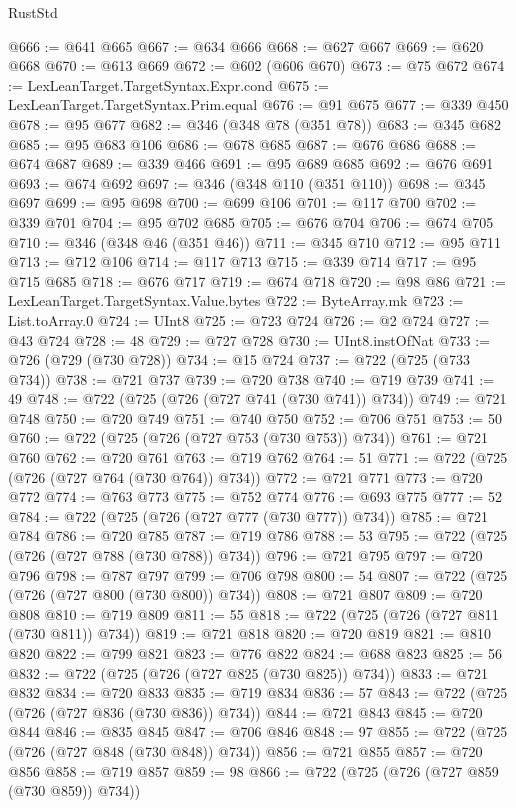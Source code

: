 \begin{lexlean}{RustStd}
\begin{coremodule}
@666 := @641 @665
@667 := @634 @666
@668 := @627 @667
@669 := @620 @668
@670 := @613 @669
@672 := @602 (@606 @670)
@673 := @75 @672
@674 := LexLeanTarget.TargetSyntax.Expr.cond
@675 := LexLeanTarget.TargetSyntax.Prim.equal
@676 := @91 @675
@677 := @339 @450
@678 := @95 @677
@682 := @346 (@348 @78 (@351 @78))
@683 := @345 @682
@685 := @95 @683 @106
@686 := @678 @685
@687 := @676 @686
@688 := @674 @687
@689 := @339 @466
@691 := @95 @689 @685
@692 := @676 @691
@693 := @674 @692
@697 := @346 (@348 @110 (@351 @110))
@698 := @345 @697
@699 := @95 @698
@700 := @699 @106
@701 := @117 @700
@702 := @339 @701
@704 := @95 @702 @685
@705 := @676 @704
@706 := @674 @705
@710 := @346 (@348 @46 (@351 @46))
@711 := @345 @710
@712 := @95 @711
@713 := @712 @106
@714 := @117 @713
@715 := @339 @714
@717 := @95 @715 @685
@718 := @676 @717
@719 := @674 @718
@720 := @98 @86
@721 := LexLeanTarget.TargetSyntax.Value.bytes
@722 := ByteArray.mk
@723 := List.toArray.{0}
@724 := UInt8
@725 := @723 @724
@726 := @2 @724
@727 := @43 @724
@728 := 48
@729 := @727 @728
@730 := UInt8.instOfNat
@733 := @726 (@729 (@730 @728))
@734 := @15 @724
@737 := @722 (@725 (@733 @734))
@738 := @721 @737
@739 := @720 @738
@740 := @719 @739
@741 := 49
@748 := @722 (@725 (@726 (@727 @741 (@730 @741)) @734))
@749 := @721 @748
@750 := @720 @749
@751 := @740 @750
@752 := @706 @751
@753 := 50
@760 := @722 (@725 (@726 (@727 @753 (@730 @753)) @734))
@761 := @721 @760
@762 := @720 @761
@763 := @719 @762
@764 := 51
@771 := @722 (@725 (@726 (@727 @764 (@730 @764)) @734))
@772 := @721 @771
@773 := @720 @772
@774 := @763 @773
@775 := @752 @774
@776 := @693 @775
@777 := 52
@784 := @722 (@725 (@726 (@727 @777 (@730 @777)) @734))
@785 := @721 @784
@786 := @720 @785
@787 := @719 @786
@788 := 53
@795 := @722 (@725 (@726 (@727 @788 (@730 @788)) @734))
@796 := @721 @795
@797 := @720 @796
@798 := @787 @797
@799 := @706 @798
@800 := 54
@807 := @722 (@725 (@726 (@727 @800 (@730 @800)) @734))
@808 := @721 @807
@809 := @720 @808
@810 := @719 @809
@811 := 55
@818 := @722 (@725 (@726 (@727 @811 (@730 @811)) @734))
@819 := @721 @818
@820 := @720 @819
@821 := @810 @820
@822 := @799 @821
@823 := @776 @822
@824 := @688 @823
@825 := 56
@832 := @722 (@725 (@726 (@727 @825 (@730 @825)) @734))
@833 := @721 @832
@834 := @720 @833
@835 := @719 @834
@836 := 57
@843 := @722 (@725 (@726 (@727 @836 (@730 @836)) @734))
@844 := @721 @843
@845 := @720 @844
@846 := @835 @845
@847 := @706 @846
@848 := 97
@855 := @722 (@725 (@726 (@727 @848 (@730 @848)) @734))
@856 := @721 @855
@857 := @720 @856
@858 := @719 @857
@859 := 98
@866 := @722 (@725 (@726 (@727 @859 (@730 @859)) @734))

\end{coremodule}
\end{lexlean}
